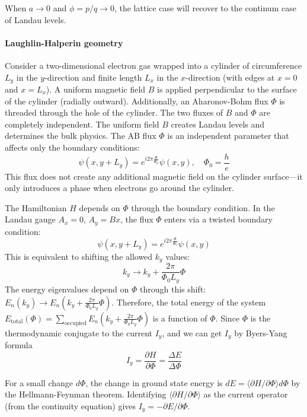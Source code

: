 \documentclass[12pt,a4paper]{article}
\begin{document}
    When $a\to 0$ and $\phi = p/q\to 0$, the lattice case will recover to the continum case of Landau levels.


\paragraph{Laughlin-Halperin geometry}

    Consider a two-dimensional electron gas wrapped into a cylinder of circumference $L_y$ in the $y$-direction and finite length $L_x$ in the $x$-direction (with edges at $x=0$ and $x=L_x$). A uniform magnetic field $B$ is applied perpendicular to the surface of the cylinder (radially outward). Additionally, an Aharonov-Bohm flux $\Phi$ is threaded through the hole of the cylinder. The two fluxes of $B$ and $\Phi$ are completely independent. The uniform field $B$ creates Landau levels and determines the bulk physics. The AB flux $\Phi$ is an independent parameter that affects only the boundary conditions:
    \[
        \psi(x, y + L_y) = e^{i2\pi\frac{\Phi}{\Phi_0}} \psi(x, y), \quad \Phi_0 = \frac{h}{e}
    \]
    This flux does not create any additional magnetic field on the cylinder surface—it only introduces a phase when electrons go around the cylinder.

    The Hamiltonian $H$ depends on $\Phi$ through the boundary condition. In the Landau gauge $A_x = 0$, $A_y = Bx$, the flux $\Phi$ enters via a twisted boundary condition:
    \[
        \psi(x, y + L_y) = e^{i2\pi\frac{\Phi}{\Phi_0}} \psi(x, y)
    \]
    This is equivalent to shifting the allowed $k_y$ values:
    \[
        k_y \to k_y + \frac{2\pi}{\Phi_0 L_y} \Phi
    \]
    The energy eigenvalues depend on $\Phi$ through this shift: $E_n(k_y) \to E_n(k_y + \frac{2\pi}{\Phi_0 L_y}\Phi)$. Therefore, the total energy of the system $E_{\text{total}}(\Phi) = \sum_{\text{occupied}} E_n(k_y + \frac{2\pi}{\Phi_0 L_y}\Phi)$ is a function of $\Phi$. Since $\Phi$ is the thermodynamic conjugate to the current $I_y$, and we can get $I_y$ by Byers-Yang formula
    \begin{equation}
    \label{eq:BY_Iy}
        I_y
        = \frac{\partial H}{\partial \Phi}
        = \frac{\Delta E}{\Delta \Phi}
    \end{equation}
    \begin{prf}
        For a small change $d\Phi$, the change in ground state energy is $dE = \langle \partial H/\partial \Phi \rangle d\Phi$ by the Hellmann-Feynman theorem. Identifying $\langle \partial H/\partial \Phi \rangle$ as the current operator (from the continuity equation) gives $I_y = -\partial E/\partial \Phi$.
    \end{prf}
\end{document}
